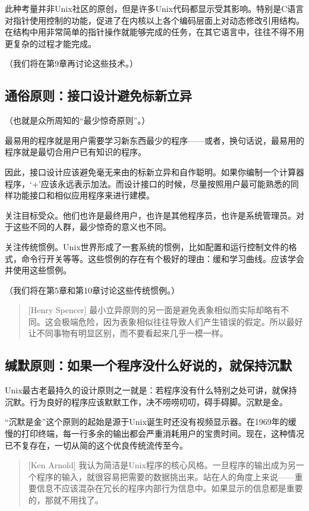 \documentclass[12pt,oneside]{ctexbook}
\begin{document}
\begin{common-format}
此种考量并非Unix社区的原创，但是许多Unix代码都显示受其影响。特别是C语言对指针使用控制的功能，促进了在内核以上各个编码层面上对动态修改引用结构。在结构中用非常简单的指针操作就能够完成的任务，在其它语言中，往往不得不用更复杂的过程才能完成。

（我们将在第9章再讨论这些技术。）

\subsection{通俗原则：接口设计避免标新立异}
（也就是众所周知的“最少惊奇原则”。）

最易用的程序就是用户需要学习新东西最少的程序——或者，换句话说，最易用的程序就是最切合用户已有知识的程序。

因此，接口设计应该避免毫无来由的标新立异和自作聪明。如果你编制一个计算器程序，‘+’应该永远表示加法。而设计接口的时候，尽量按照用户最可能熟悉的同样功能接口和相似应用程序来进行建模。

关注目标受众。他们也许是最终用户，也许是其他程序员，也许是系统管理员。对于这些不同的人群，最少惊奇的意义也不同。

关注传统惯例。Unix世界形成了一套系统的惯例，比如配置和运行控制文件的格式，命令行开关等等。这些惯例的存在有个极好的理由：缓和学习曲线。应该学会并使用这些惯例。

（我们将在第5章和第10章讨论这些传统惯例。）

\begin{quote}[Henry Spencer]
最小立异原则的另一面是避免表象相似而实际却略有不同。这会极端危险，因为表象相似往往导致人们产生错误的假定。所以最好让不同事物有明显区别，而不要看起来几乎一模一样。
\end{quote}


\subsection{缄默原则：如果一个程序没什么好说的，就保持沉默}
Unix最古老最持久的设计原则之一就是：若程序没有什么特别之处可讲，就保持沉默。行为良好的程序应该默默工作，决不唠唠叨叨，碍手碍脚。沉默是金。

“沉默是金”这个原则的起始是源于Unix诞生时还没有视频显示器。在1969年的缓慢的打印终端，每一行多余的输出都会严重消耗用户的宝贵时间。现在，这种情况已不复存在，一切从简的这个优良传统流传至今。

\begin{quote}[Ken Arnold]
我认为简洁是Unix程序的核心风格。一旦程序的输出成为另一个程序的输入，就很容易把需要的数据挑出来。站在人的角度上来说——重要信息不应该混杂在冗长的程序内部行为信息中。如果显示的信息都是重要的，那就不用找了。
\end{quote}


\end{common-format}
\end{document}
